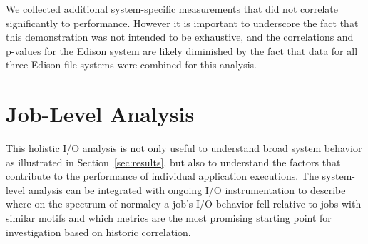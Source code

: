 We collected additional system-specific measurements that did not correlate significantly to performance.
However it is important to underscore the fact that this demonstration was not intended to be exhaustive, and the correlations and p-values for the Edison system are likely diminished by the fact that data for all three Edison file systems were combined for this analysis.

\section{Job-Level Analysis} \label{sec:results/umami}

This holistic I/O analysis is not only useful to understand broad system behavior as illustrated in Section~\ref{sec:results}, but also to understand the factors that contribute to the performance of individual application executions.
The system-level analysis can be integrated with ongoing I/O instrumentation to describe
where on the spectrum of normalcy a job's I/O behavior fell relative to
jobs with similar motifs and which metrics are the most promising starting point for
investigation based on historic correlation.

